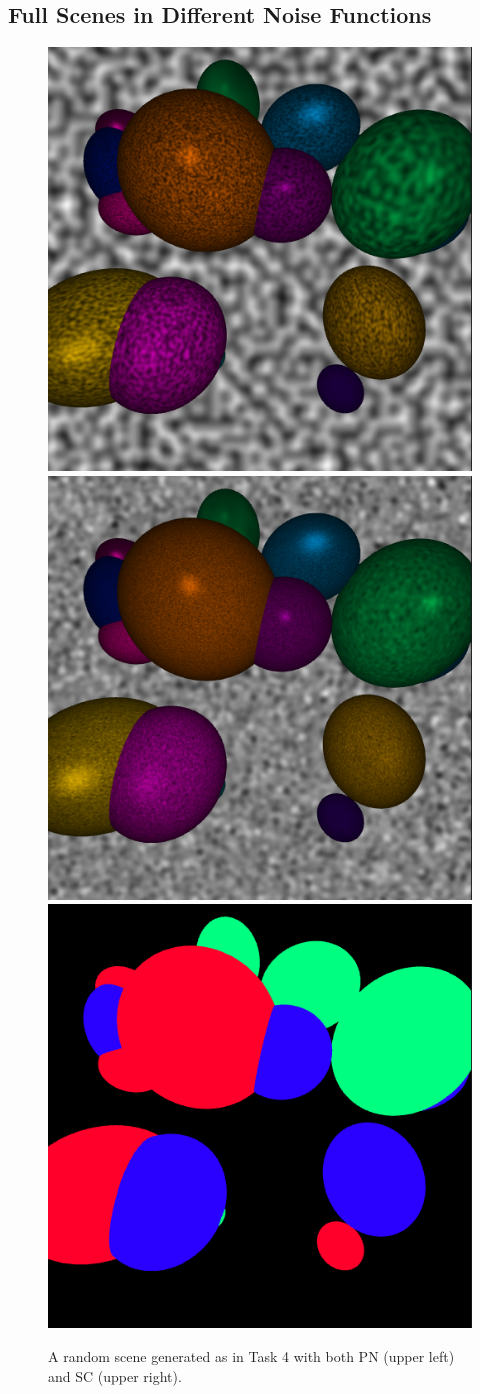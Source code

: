 \documentclass[12pt,fleqn]{article}
\begin{document}
\subsection{Full Scenes in Different Noise Functions}\label{sec:appt4}
\begin{figure}[H]
    \centering
        \includegraphics[width=.49\linewidth]{scene-example-perlin}
        \includegraphics[width=.49\linewidth]{scene-example-sc}
        \includegraphics[width=.49\linewidth]{scene-example-labelmap}
        \caption{A random scene generated as in Task 4 with both PN (upper left) and SC (upper right).}
    \label{fig:appt4}
\end{figure}\noindent
\end{document}
